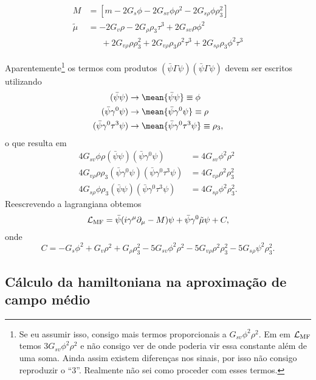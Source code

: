 \begin{align}
    M &= [m - 2 G_s \phi - 2G_{sv}\phi\rho^2 - 2G_{s\rho}\phi\rho_3^2] \\
    \tilde\mu &= - 2G_v\rho - 2G_\rho\rho_3\tau^3 + 2G_{sv}\rho\phi^2 \nonumber \\
    &\phantom{=~}+ 2G_{v\rho}\rho \rho_3^2 + 2G_{v\rho}\rho_3\rho^2\tau^3 + 2G_{s\rho}\rho_3\phi^2\tau^3
\end{align}

\textrm{Aparentemente}\footnote[][-1cm]{Se eu assumir isso, consigo mais termos proporcionais a $G_{sv} \phi^2\rho^2$. Em \cite{japoneses} em $\mathcal{L}_{\rm{MF}}$ temos $3G_{sv} \phi^2\rho^2$ e não consigo ver de onde poderia vir essa constante além de uma soma. Ainda assim existem diferenças nos sinais, por isso não consigo reproduzir o ``3''. Realmente não sei como proceder com esses termos.} os termos com produtos $(\bar\psi\Gamma\psi)(\bar\psi\Gamma\psi)$ devem ser escritos utilizando
\begin{align}
    (\bar\psi\psi) &\to \mean{\bar\psi\psi} \equiv \phi \\
    (\bar\psi\gamma^0\psi) &\to \mean{\bar\psi\gamma^0\psi} \equiv \rho \\
    (\bar\psi\gamma^0\tau^3\psi) &\to \mean{\bar\psi\gamma^0\tau^3\psi} \equiv \rho_3,
\end{align}
%
o que resulta em
\begin{align}
    4G_{sv}\phi\rho(\bar\psi\psi)(\bar\psi\gamma^0\psi) &= 4G_{sv}\phi^2\rho^2\\
    4G_{v\rho}\rho\rho_3(\bar\psi\gamma^0\psi)(\bar\psi\gamma^0\tau^3\psi) &= 4G_{v\rho} \rho^2\rho_3^2 \\
    4G_{s\rho} \phi\rho_3(\bar\psi\psi)(\bar\psi\gamma^0\tau^3\psi) &= 4G_{s\rho}\phi^2\rho_3^2.
\end{align}
%
Reescrevendo a lagrangiana obtemos
\begin{equation}
\mathcal{L}_{\rm{MF}} = \bar{\psi}(i\gamma^\mu\partial_\mu - M)\psi + \bar\psi\gamma^0 \tilde\mu \psi + C,
\end{equation}
%
onde
\begin{equation}
    C = - G_s\phi^2 + G_v\rho^2 + G_{\rho}\rho_3^2 - 5G_{sv}\phi^2\rho^2 - 5G_{v\rho}\rho^2\rho_3^2 - 5 G_{s\rho}\psi^2\rho_3^2.
\end{equation}

\subsection{Cálculo da hamiltoniana na aproximação de campo médio}

